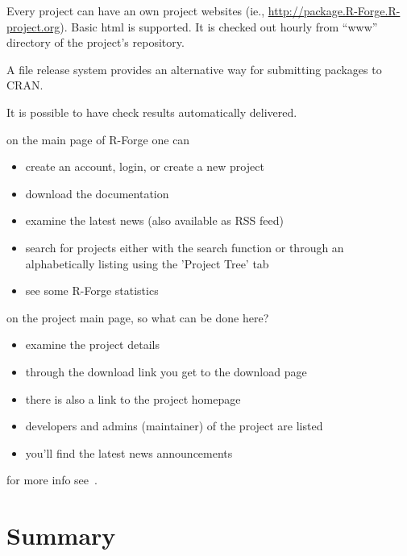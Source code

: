 Every project can have an own project websites (ie.,
\url{http://package.R-Forge.R-project.org}). Basic html is
supported. It is checked out hourly from ``www'' directory of the
project's repository.

A file release system provides an
alternative way for submitting packages to CRAN. 

It is possible to have check results automatically delivered. 



on the main page of R-Forge one can

\begin{itemize}

\item create an account, login, or create a new project

\item download the documentation

\item examine the latest news (also available as RSS feed)

\item search for projects either with the search function or through an
  alphabetically listing using the 'Project Tree' tab 

\item see some R-Forge statistics

\end{itemize}


on the project main page, so what can be done here?

\begin{itemize}

\item examine the project details

\item through the download link you get to the download page

\item there is also a link to the project homepage

\item developers and admins (maintainer) of the project are listed 

\item you'll find the latest news announcements

\end{itemize}


for more info see~\cite{theussl07:r_forge_users_manual}.

\section*{Summary}


